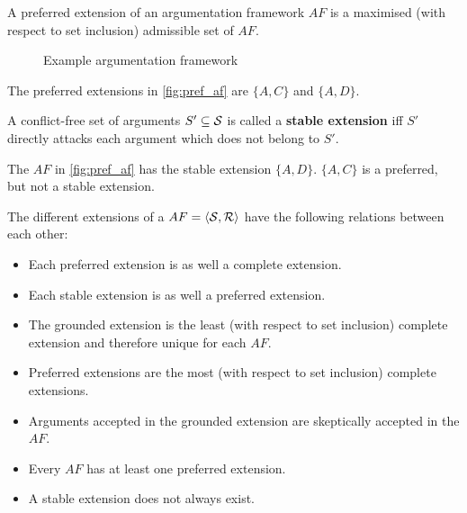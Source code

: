 \begin{definition}
A preferred extension of an argumentation framework $AF$ is a maximised (with respect to set inclusion) admissible set of $AF$.
\end{definition}

\begin{figure}[t]
\centering
{}
\caption{Example argumentation framework}
\label{fig:pref_af}
\end{figure}

\begin{exa}
The preferred extensions in \autoref{fig:pref_af} are $\{A, C\}$ and $\{A, D\}$.
\end{exa}

\begin{definition}
A conflict-free set of arguments $S' \subseteq \S$ is called a \textbf{stable extension} iff $S'$ directly attacks each argument which does not belong to $S'$.
\end{definition}
\begin{exa}
The $AF$ in \autoref{fig:pref_af} has the stable extension $\{A, D\}$. $\{A, C\}$ is a preferred, but not a stable extension.
\end{exa}


\begin{remark}
The different extensions of a $AF = \langle \S, \R \rangle$ have the following relations between each other:
\begin{itemize} 
	\item Each preferred extension is as well a complete extension.
	\item Each stable extension is as well a preferred extension.
	\item The grounded extension is the least (with respect to set inclusion) complete extension and therefore unique for each $AF$.
	\item Preferred extensions are the most (with respect to set inclusion) complete extensions.
	\item Arguments accepted in the grounded extension are skeptically accepted in the $AF$.
	\item Every $AF$ has at least one preferred extension.
	\item A stable extension does not always exist.
\end{itemize}
\end{remark}

